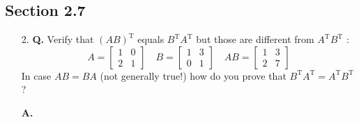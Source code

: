 \documentclass[main.tex]{subfiles}
\begin{document}
\subsection{Section 2.7}
\begin{enumerate}
    \item [2.] \textbf{Q.} Verify that $(A B)^{\mathrm{T}}$ equals $B^{\mathrm{T}} A^{\mathrm{T}}$ but those are different from $A^{\mathrm{T}} B^{\mathrm{T}}$ :
    $$
    A=\left[\begin{array}{ll}
    1 & 0 \\
    2 & 1
    \end{array}\right] \quad B=\left[\begin{array}{ll}
    1 & 3 \\
    0 & 1
    \end{array}\right] \quad A B=\left[\begin{array}{ll}
    1 & 3 \\
    2 & 7
    \end{array}\right]
    $$
    In case $A B=B A$ (not generally true!) how do you prove that $B^{\mathrm{T}} A^{\mathrm{T}}=A^{\mathrm{T}} B^{\mathrm{T}}$ ? 
    
    \textbf{A.}
    

\end{enumerate}
\end{document}
